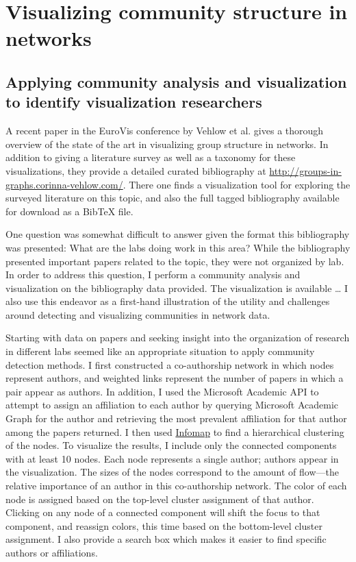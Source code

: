\hypertarget{visualization}{\section{Visualizing community structure in
networks}\label{visualization}}

\protect\hyperlink{visualization}{}

\hypertarget{visualizing-labs}{\subsection{Applying community analysis
and visualization to identify visualization
researchers}\label{visualizing-labs}}

\protect\hyperlink{visualizing-labs}{}

A recent paper in the EuroVis conference by Vehlow et al.
\autocite{vehlow_state_2015} gives a thorough overview of the state of
the art in visualizing group structure in networks. In addition to
giving a literature survey as well as a taxonomy for these
visualizations, they provide a detailed curated bibliography at
\url{http://groups-in-graphs.corinna-vehlow.com/}. There one finds a
visualization tool for exploring the surveyed literature on this topic,
and also the full tagged bibliography available for download as a BibTeX
file.

One question was somewhat difficult to answer given the format this
bibliography was presented: What are the labs doing work in this area?
While the bibliography presented important papers related to the topic,
they were not organized by lab. In order to address this question, I
perform a community analysis and visualization on the bibliography data
provided. The visualization is available \ldots{} I also use this
endeavor as a first-hand illustration of the utility and challenges
around detecting and visualizing communities in network data.

Starting with data on papers and seeking insight into the organization
of research in different labs seemed like an appropriate situation to
apply community detection methods. I first constructed a co-authorship
network in which nodes represent authors, and weighted links represent
the number of papers in which a pair appear as authors. In addition, I
used the Microsoft Academic API  to attempt to assign an
affiliation to each author by querying Microsoft Academic Graph for the
author and retrieving the most prevalent affiliation for that author
among the papers returned. I then used
\protect\hyperlink{the-dynamical-perspective}{Infomap} to find a
hierarchical clustering of the nodes. To visualize the results, I
include only the connected components with at least 10 nodes. Each node
represents a single author;  authors appear in the
visualization. The sizes of the nodes correspond to the amount of
flow---the relative importance of an author in this co-authorship
network. The color of each node is assigned based on the top-level
cluster assignment of that author. Clicking on any node of a connected
component will shift the focus to that component, and reassign colors,
this time based on the bottom-level cluster assignment. I also provide a
search box which makes it easier to find specific authors or
affiliations.

